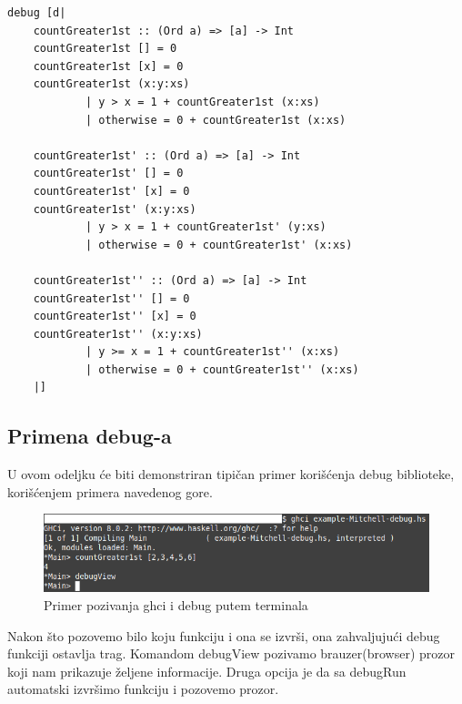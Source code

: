 \documentclass[a4paper]{article}
\begin{document}
{{\begin{lstlisting}[caption={Okružujemo naš kod funkcijom debug, iz biblioteke Debug, sa uključivanjem ekstenzija navedenih u prvom redu}, language=Haskell]
debug [d|
    countGreater1st :: (Ord a) => [a] -> Int
    countGreater1st [] = 0
    countGreater1st [x] = 0
    countGreater1st (x:y:xs) 
            | y > x = 1 + countGreater1st (x:xs)
            | otherwise = 0 + countGreater1st (x:xs)
    
    countGreater1st' :: (Ord a) => [a] -> Int
    countGreater1st' [] = 0
    countGreater1st' [x] = 0
    countGreater1st' (x:y:xs) 
            | y > x = 1 + countGreater1st' (y:xs)
            | otherwise = 0 + countGreater1st' (x:xs)

    countGreater1st'' :: (Ord a) => [a] -> Int
    countGreater1st'' [] = 0
    countGreater1st'' [x] = 0
    countGreater1st'' (x:y:xs) 
            | y >= x = 1 + countGreater1st'' (x:xs)
            | otherwise = 0 + countGreater1st'' (x:xs)
    |]
\end{lstlisting}

\subsection{Primena debug-a}
U ovom odeljku će biti demonstriran tipičan primer korišćenja debug biblioteke, korišćenjem primera navedenog gore.

\begin{figure}[h!]
\begin{center}
\includegraphics[scale=0.5]{pozivanje-mitchell.png}
\caption{Primer pozivanja ghci i debug putem terminala}
\end{center}
\end{figure}

Nakon što pozovemo bilo koju funkciju i ona se izvrši, ona zahvaljujući debug funkciji ostavlja trag. Komandom debugView pozivamo brauzer(browser) prozor koji nam prikazuje željene informacije. Druga opcija je da sa debugRun automatski izvršimo funkciju i pozovemo prozor\cite{mitchell-debug}.

}}
\end{document}
